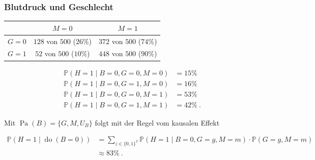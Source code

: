\documentclass{beamer}
\newcommand{\Do}{\operatorname{do}}
\newcommand{\Pa}{\operatorname{Pa}}
\begin{document}
\begin{frame}
\frametitle{Blutdruck und Geschlecht}

\begin{scriptsize}
\begin{center}
\begin{tabular}{| c | c | c |}
\hline
& $M = 0$ & $M = 1$\\
\hline
$G = 0$ & $128$ von $500$ ($26 \%$) & $372$ von $500$ ($74 \%$)\\
\hline
$G = 1$ & $52$ von $500$ ($10 \%$) & $448$ von $500$ ($90 \%$)\\
\hline
\end{tabular}
\end{center}
\end{scriptsize}

\begin{scriptsize}
\begin{align*}
\mathbb{P}(H = 1 \mid B = 0, G = 0, M = 0) &= 15 \%\\
\mathbb{P}(H = 1 \mid B = 0, G = 1, M = 0) &= 16 \%\\
\mathbb{P}(H = 1 \mid B = 0, G = 0, M = 1) &= 53 \%\\
\mathbb{P}(H = 1 \mid B = 0, G = 1, M = 1) &= 42 \%~.
\end{align*}
\end{scriptsize}

\pause

Mit $\Pa(B) = \{G, M, U_B\}$ folgt mit der Regel vom kausalen Effekt
\begin{scriptsize}
\begin{align*}
\mathbb{P}(H = 1 \mid \Do(B = 0)) &= \sum_{z \in \{0, 1\}^2} \mathbb{P}(H = 1 \mid B = 0, G = g, M = m) \cdot \mathbb{P}(G = g, M = m)\\
&\approx 83 \%~.
\end{align*}
\end{scriptsize}
\end{frame}
\end{document}
